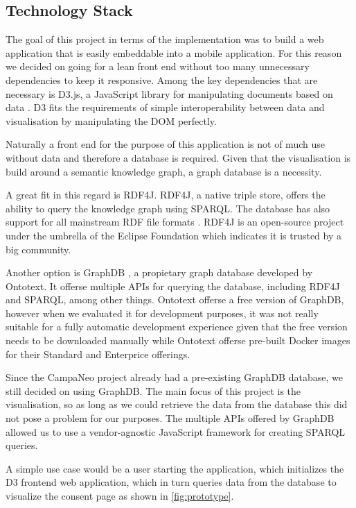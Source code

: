 \documentclass[../paper.tex]{subfiles}
\begin{document}
  \subsection{Technology Stack}

  The goal of this project in terms of the implementation was to
  build a web application that is easily embeddable into a mobile application.
  For this reason we decided on going for a lean front end without too many
  unnecessary dependencies to keep it responsive. Among the key dependencies that
  are necessary is D3.js, a JavaScript library for manipulating documents based
  on data \cite{d3}. D3 fits the requirements of simple interoperability between
  data and visualisation by manipulating the DOM perfectly.

  Naturally a front end for the purpose of this application is not of much use
  without data and therefore a database is required. Given that the
  visualisation is build around a semantic knowledge graph, a graph database is
  a necessity.

  A great fit in this regard is RDF4J. RDF4J, a native triple
  store, offers the ability to query the knowledge graph using SPARQL. The
  database has also support for all mainstream RDF file formats \cite{rdf4j}.
  RDF4J is an open-source project under the umbrella of the Eclipse Foundation
  which indicates it is trusted by a big community.

  Another option is GraphDB \cite{graphdb}, a propietary graph database developed by Ontotext.
  It offerse multiple APIs for querying the database, including RDF4J and SPARQL,
  among other things. Ontotext offerse a free version of GraphDB, however when
  we evaluated it for development purposes, it was not really suitable for a
  fully automatic development experience given that the free version needs to
  be downloaded manually while Ontotext offerse pre-built Docker images for
  their Standard and Enterprice offerings.

  Since the CampaNeo project already had a pre-existing GraphDB database, we
  still decided on using GraphDB. The main focus of this project is the
  visualisation, so as long as we could retrieve the data from the database
  this did not pose a problem for our purposes. The multiple APIs offered by
  GraphDB allowed us to use a vendor-agnostic JavaScript framework for
  creating SPARQL queries.

  A simple use case would be a user starting the application, which initializes
  the D3 frontend web application, which in turn queries data from the database
  to visualize the consent page as shown in \cref{fig:prototype}.
\end{document}
